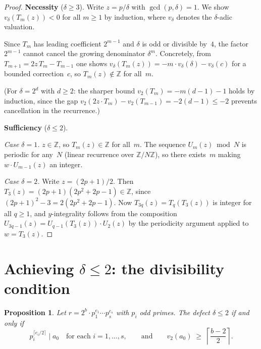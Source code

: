 \documentclass[11pt]{article}
\newtheorem{proposition}[theorem]{Proposition}
\theoremstyle{definition}
\theoremstyle{remark}
\begin{document}
\begin{proof}
\textbf{Necessity} ($\delta \ge 3$).
Write $z = p/\delta$ with $\gcd(p, \delta) = 1$.
We show $v_\delta(T_m(z)) < 0$ for all $m \ge 1$ by induction,
where $v_\delta$ denotes the $\delta$-adic valuation.

Since $T_m$ has leading coefficient $2^{m-1}$ and $\delta$ is odd or
divisible by~$4$, the factor $2^{m-1}$ cannot cancel the growing
denominator $\delta^m$.  Concretely, from
$T_{m+1} = 2z\,T_m - T_{m-1}$ one shows
$v_\delta(T_m(z)) = -m \cdot v_\delta(\delta) - v_\delta(c)$ for a
bounded correction~$c$, so $T_m(z) \notin \mathbb{Z}$ for all~$m$.

(For $\delta = 2^d$ with $d \ge 2$: the sharper bound
$v_2(T_m) = -m(d{-}1) - 1$ holds by induction, since the gap
$v_2(2z \cdot T_m) - v_2(T_{m-1}) = -2(d{-}1) \le -2$ prevents
cancellation in the recurrence.)

\smallskip
\textbf{Sufficiency} ($\delta \le 2$).

\emph{Case $\delta = 1$.}\;
$z \in \mathbb{Z}$, so $T_m(z) \in \mathbb{Z}$ for all~$m$.
The sequence $U_m(z) \bmod N$ is periodic for any~$N$
(linear recurrence over $\mathbb{Z}/N\mathbb{Z}$), so there exists~$m$
making $w \cdot U_{m-1}(z)$ an integer.

\emph{Case $\delta = 2$.}\;
Write $z = (2p+1)/2$.  Then $T_3(z) = (2p{+}1)(2p^2{+}2p{-}1) \in \mathbb{Z}$,
since $(2p+1)^2 - 3 = 2(2p^2+2p-1)$.
Now $T_{3q}(z) = T_q(T_3(z))$ is integer for all $q \ge 1$,
and $y$-integrality follows from the composition
$U_{3q-1}(z) = U_{q-1}(T_3(z)) \cdot U_2(z)$
by the periodicity argument applied to $w = T_3(z)$.
\end{proof}

\section{Achieving $\delta \le 2$: the divisibility condition}

\begin{proposition}\label{prop:div}
Let $r = 2^b \cdot p_1^{e_1} \cdots p_s^{e_s}$ with $p_i$ odd primes.
The defect $\delta \le 2$ if and only if
\begin{equation}\label{eq:divcond}
p_i^{\lceil e_i/2 \rceil} \mid a_0
\quad\text{for each } i = 1, \ldots, s,
\qquad\text{and}\qquad
v_2(a_0) \;\ge\; \left\lceil\frac{b-2}{2}\right\rceil.
\end{equation}
\end{proposition}
\end{document}
